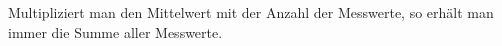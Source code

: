 
Multipliziert man den Mittelwert mit der Anzahl der Messwerte, so erhält man immer die Summe aller Messwerte.
